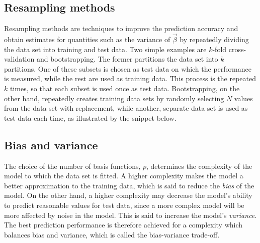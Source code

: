 \documentclass[11pt,british,a4paper]{article}
\numberwithin{equation}{section}
\begin{document}
\subsection{Resampling methods}
Resampling methods are techniques to improve the prediction accuracy and obtain estimates for quantities such as the variance of \(\vec{\beta}\) by repeatedly dividing the data set into training and test data.
Two simple examples are \(k\)-fold cross-validation and bootstrapping.
The former partitions the data set into \(k\) partitions.
One of these subsets is chosen as test data on which the performance is measured, while the rest are used as training data.
This process is the repeated \(k\) times, so that each subset is used once as test data.
Bootstrapping, on the other hand, repeatedly creates training data sets by randomly selecting \(N\) values from the data set with replacement, while another, separate data set is used as test data each time, as illustrated by the snippet below.


\subsection{Bias and variance}
The choice of the number of basis functions, \(p\), determines the complexity of the model to which the data set is fitted.
A higher complexity makes the model a better approximation to the training data, which is said to reduce the \emph{bias} of the model.
On the other hand, a higher complexity may decrease the model's ability to predict reasonable values for test data, since a more complex model will be more affected by noise in the model.
This is said to increase the model's \emph{variance}.
The best prediction performance is therefore achieved for a complexity which balances bias and variance, which is called the bias-variance trade-off\cite{mehta}.
\end{document}
